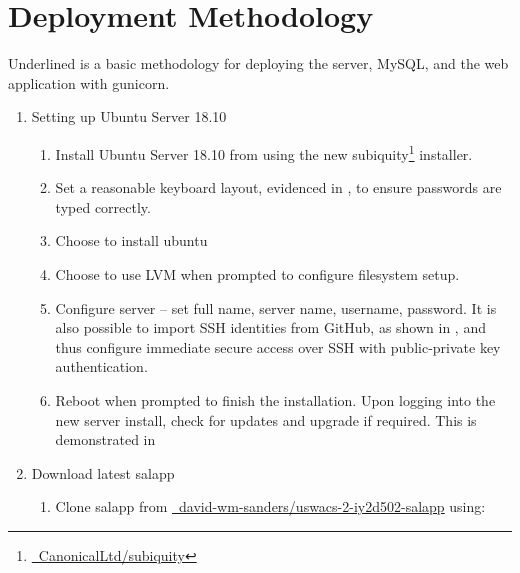 \section{Deployment Methodology}
Underlined is a basic methodology for deploying the server, MySQL, and the web application with gunicorn.

\begin{enumerate}
  \item Setting up Ubuntu Server 18.10
    \begin{enumerate}[label=\roman*\textasciitilde]
      \item Install Ubuntu Server 18.10 from  using the new subiquity\footnote{\href{https://github.com/CanonicalLtd/subiquity}{\faGithub\ CanonicalLtd/subiquity}} installer. 
      \item Set a reasonable keyboard layout, evidenced in  , to ensure passwords are typed correctly.
      \item Choose to install ubuntu  
      \item Choose to use LVM when prompted to configure filesystem setup.  
      \item Configure server -- set full name, server name, username, password. It is also possible to import SSH identities from GitHub, as shown in , and thus configure immediate secure access over SSH with public-private key authentication.
      \item Reboot when prompted to finish the installation. Upon logging into the new server install, check for updates and upgrade if required. This is demonstrated in 
    \end{enumerate}
  \item Download latest salapp
    \begin{enumerate}[label=\roman*\textasciitilde]
      \item Clone salapp from \href{https://github.com/david-wm-sanders/uswacs-2-iy2d502-salapp}{\faGithub\ david-wm-sanders/uswacs-2-iy2d502-salapp} using:\\

\end{enumerate}
\end{enumerate}
